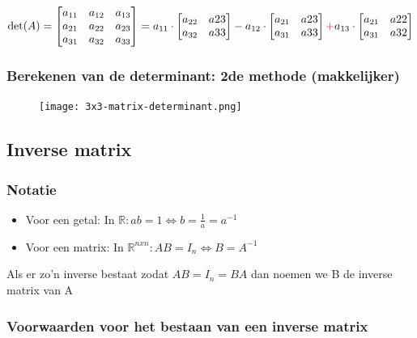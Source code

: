 \documentclass{article}
\begin{document}
$\text{det}(A) = \begin{bmatrix}
a_{11} & a_{12} & a_{13}\\
a_{21} & a_{22} & a_{23}\\
a_{31} & a_{32} & a_{33}
\end{bmatrix} = a_{11} \cdot 
\begin{bmatrix}
a_{22} & a{23}\\
a_{32} & a{33}
\end{bmatrix} - a_{12} \cdot 
\begin{bmatrix}
a_{21} & a{23}\\
a_{31} & a{33}
\end{bmatrix} \textcolor{red}{+}  a_{13} \cdot 
\begin{bmatrix}
a_{21} & a{22}\\
a_{31} & a{32}
\end{bmatrix}
$

\subsubsection{Berekenen van de determinant: 2de methode (makkelijker)}

\begin{figure}[H]
    \centering
    \texttt{[image: 3x3-matrix-determinant.png]}
\end{figure}


\subsection{Inverse matrix}

\subsubsection{Notatie}

\begin{itemize}
    \item Voor een getal: In $\mathbb{R}: ab = 1 \Leftrightarrow b = \frac{1}{a} = a^{-1}$
    \item Voor een matrix: In $\mathbb{R}^{nxn}: AB = I_n \Leftrightarrow B  = A^{-1}$
\end{itemize}

Als er zo'n inverse bestaat zodat $AB = I_n = BA$ dan noemen we B de inverse matrix van A

\subsubsection{Voorwaarden voor het bestaan van een inverse matrix}
\end{document}
